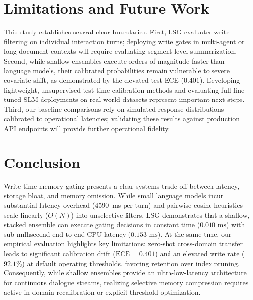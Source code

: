 \documentclass[journal]{IEEEtran}
\begin{document}
\section{Limitations and Future Work}
This study establishes several clear boundaries. First, LSG evaluates write filtering on individual interaction turns; deploying write gates in multi-agent or long-document contexts will require evaluating segment-level summarization. Second, while shallow ensembles execute orders of magnitude faster than language models, their calibrated probabilities remain vulnerable to severe covariate shift, as demonstrated by the elevated test ECE ($0.401$). Developing lightweight, unsupervised test-time calibration methods and evaluating full fine-tuned SLM deployments on real-world datasets represent important next steps. Third, our baseline comparisons rely on simulated response distributions calibrated to operational latencies; validating these results against production API endpoints will provide further operational fidelity.

\section{Conclusion}
Write-time memory gating presents a clear systems trade-off between latency, storage bloat, and memory omission. While small language models incur substantial latency overhead (45\text{--}90~ms per turn) and pairwise cosine heuristics scale linearly ($O(N)$) into unselective filters, LSG demonstrates that a shallow, stacked ensemble can execute gating decisions in constant time ($0.010\text{ ms}$) with sub-millisecond end-to-end CPU latency ($0.153\text{ ms}$). At the same time, our empirical evaluation highlights key limitations: zero-shot cross-domain transfer leads to significant calibration drift ($\text{ECE} = 0.401$) and an elevated write rate ($92.1\%$) at default operating thresholds, favoring retention over index pruning. Consequently, while shallow ensembles provide an ultra-low-latency architecture for continuous dialogue streams, realizing selective memory compression requires active in-domain recalibration or explicit threshold optimization.
\end{document}
